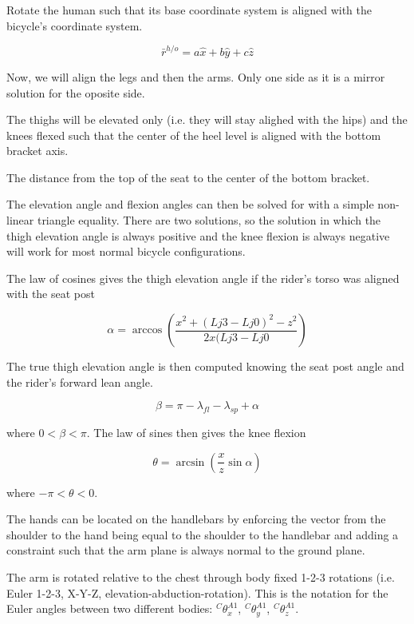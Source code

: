 \documentclass[10pt]{article}
\begin{document}
Rotate the human such that its base coordinate system is aligned with the
bicycle's coordinate system.

\begin{equation}
  \bar{r}^{h/o} = a \hat{x} + b \hat{y} + c \hat{z}
\end{equation}

Now, we will align the legs and then the arms. Only one side as it is a mirror
solution for the oposite side.

The thighs will be elevated only (i.e. they will stay alighed with the hips)
and the knees flexed such that the center of the heel level is aligned with the
bottom bracket axis.

The distance from the top of the seat to the center of the bottom bracket.

The elevation angle and flexion angles can then be solved for with a simple
non-linear triangle equality. There are two solutions, so the solution in which
the thigh elevation angle is always positive and the knee flexion is always
negative will work for most normal bicycle configurations.

The law of cosines gives the thigh elevation angle if the rider's torso was
aligned with the seat post

\begin{equation}
	\alpha = \operatorname{arccos}\left(\frac{x^2 + (Lj3 - Lj0)^2 - z^2}{2x(Lj3 -
	Lj0}\right)
\end{equation}

The true thigh elevation angle is then computed knowing the seat post angle and
the rider's forward lean angle.

\begin{equation}
	\beta = \pi - \lambda_{fl} - \lambda_{sp} + \alpha
\end{equation}

where $0<\beta<\pi$. The law of sines then gives the knee flexion

\begin{equation}
	\theta = \operatorname{arcsin}\left(\frac{x}{z} \operatorname{sin}\alpha\right)
\end{equation}

where \(-\pi<\theta<0\).

The hands can be located on the handlebars by enforcing the vector from the
shoulder to the hand being equal to the shoulder to the handlebar and adding
a constraint such that the arm plane is always normal to the ground plane.

The arm is rotated relative to the chest through body fixed 1-2-3 rotations
(i.e. Euler 1-2-3, X-Y-Z, elevation-abduction-rotation). This is the notation
for the Euler angles between two different bodies: \({}^C\theta^{A1}_x\),
\({}^C\theta^{A1}_y\), \({}^C\theta^{A1}_z\).
\end{document}
